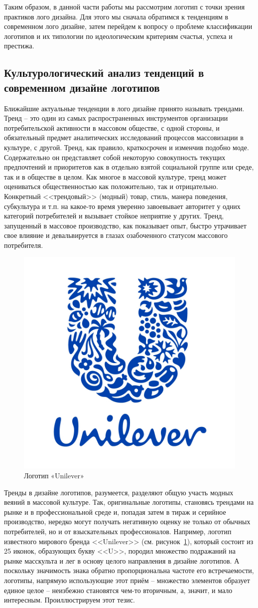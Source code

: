 Таким образом, в данной части работы мы рассмотрим логотип с точки зрения практиков лого
дизайна. Для этого мы сначала обратимся к тенденциям в современном лого дизайне, затем перейдем к
вопросу о проблеме классификации логотипов и их типологии по идеологическим критериям счастья,
успеха и престижа.

\subsection{Культурологический анализ тенденций в современном дизайне логотипов}
Ближайшие актуальные тенденции в лого дизайне принято называть трендами. Тренд -- это один из самых распространенных инструментов организации потребительской активности в массовом обществе, с одной стороны, и обязательный предмет аналитических исследований процессов массовизации в культуре, с другой. Тренд, как правило, краткосрочен и изменчив подобно моде. Содержательно он представляет собой некоторую совокупность текущих предпочтений и приоритетов как в отдельно взятой социальной группе или среде, так и в обществе в целом. Как многое в массовой культуре, тренд может оцениваться общественностью как положительно, так и отрицательно. Конкретный <<трендовый>> (модный) товар, стиль, манера поведения, субкультура и т.п. на какое-то время уверенно завоевывает авторитет у одних категорий потребителей и вызывает стойкое неприятие у других. Тренд, запущенный в массовое производство, как показывает опыт, быстро утрачивает свое влияние и девальвируется в глазах озабоченного статусом массового потребителя.

\begin{figure}
  \centering
  \includegraphics[width=.3\linewidth]{images/unilever}
  \caption{Логотип «Unilever»}
  \label{fig:unilever}
\end{figure}

Тренды в дизайне логотипов, разумеется, разделяют общую участь модных веяний в массовой культуре. Так, оригинальные логотипы, становясь трендами на рынке и в профессиональной среде и, попадая затем в тираж и серийное производство, нередко могут получать негативную оценку не только от обычных потребителей, но и от взыскательных профессионалов. Например, логотип известного мирового бренда <<Unilever>> (см. рисунок~\ref{fig:unilever}), который состоит из 25 иконок, образующих букву <<U>>, породил множество подражаний на рынке масскульта и лег в основу целого направления в дизайне логотипов. А поскольку значимость знака обратно пропорциональна частоте его встречаемости, логотипы, напрямую использующие этот приём -- множество элементов образует единое целое -- неизбежно становятся чем-то вторичным, а, значит, и мало интересным. Проиллюстрируем этот тезис.

